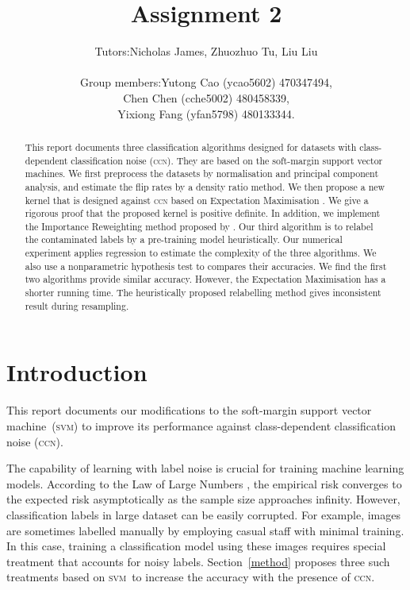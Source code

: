 \documentclass[12pt]{article} %
\title{Assignment 2}
\newcommand{\svm}{\textsc{svm}}
\begin{document}
\author{%
 \begin{tabular}{rl}
  Tutors:& Nicholas James, Zhuozhuo Tu, Liu Liu\\ \\
Group members: & Yutong Cao (ycao5602) 470347494,\\
& Chen Chen (cche5002) 480458339,\\
& Yixiong Fang (yfan5798) 480133344.
\end{tabular}
}

\maketitle



\begin{abstract}

This report documents three classification algorithms designed for datasets with class-dependent classification noise (\textsc{ccn}). They are based on the soft-margin support vector machines. We first preprocess the datasets by normalisation and principal component analysis, and estimate the flip rates by a density ratio method. We then propose a new kernel that is designed against \textsc{ccn} based on Expectation Maximisation . We give a rigorous proof that the proposed kernel is positive definite. In addition, we implement the Importance Reweighting method proposed by \citet{liu2016classification}. Our third algorithm is to  relabel the contaminated labels by a pre-training model heuristically. Our numerical experiment applies regression to estimate the complexity of the three algorithms. We also use a nonparametric hypothesis test to compares their accuracies. We find the first two algorithms provide similar accuracy. However, the Expectation Maximisation has a shorter running time. The heuristically proposed relabelling method gives inconsistent result during resampling.
\end{abstract}
\tableofcontents
\section{Introduction}
This report documents our modifications to the soft-margin support vector machine~(\svm) to improve its performance against class-dependent classification noise (\textsc{ccn}).

The capability of learning with label noise is crucial for training machine learning models. According to the Law of Large Numbers \citep{hardle2007applied}, the empirical risk converges to the expected risk asymptotically as the sample size approaches infinity. However, classification labels in large dataset can be easily corrupted. For example, images  are sometimes labelled manually by employing casual staff with minimal training. In this case, training a classification model using these images requires special treatment that accounts for noisy labels. Section~\ref{method} proposes three such treatments based on \svm\ to increase the accuracy with the presence of \textsc{ccn}.
\end{document}
